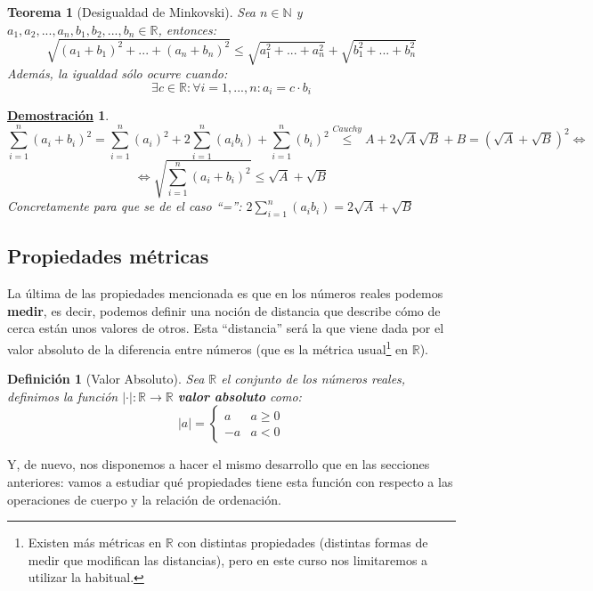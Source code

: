 \documentclass[10pt,a4paper,openright]{book}
\theoremstyle{break}
\newtheorem{defi}{Definición}[chapter]
\newtheorem{theo}{Teorema}[chapter]
\newtheorem*{demo}{\underline{Demostración}}
\begin{document}
\begin{theo}[Desigualdad de Minkovski]
Sea $n\in \mathbb N$ y $a_1, a_2, ..., a_n, b_1, b_2, ..., b_n\in \mathbb R$, entonces:
$$\sqrt{(a_1+b_1)^2+...+(a_n+b_n)^2}\leq \sqrt{a_1^2+...+a_n^2}+\sqrt{b_1^2+...+b_n^2}$$
Además, la igualdad sólo ocurre cuando:
$$\exists c\in \mathbb R : \forall i=1,...,n : a_i=c\cdot b_i$$
\end{theo}
\begin{demo}
$$\sum_{i=1}^n (a_i+b_i)^2=\sum_{i=1}^n (a_i)^2+2\sum_{i=1}^n (a_ib_i)+ \sum_{i=1}^n (b_i)^2\stackrel{Cauchy}{\leq}A+2\sqrt{A}\sqrt{B}+B=(\sqrt{A}+\sqrt{B})^2\Leftrightarrow$$
$$\Leftrightarrow \sqrt{\sum_{i=1}^n (a_i+b_i)^2}\leq \sqrt{A}+\sqrt{B}$$
Concretamente para que se de el caso ``='': $2\sum_{i=1}^n (a_ib_i)=2\sqrt{A}+\sqrt{B}$
\end{demo}

\subsection{Propiedades métricas}
La última de las propiedades mencionada es que en los números reales podemos \textbf{medir}, es decir, podemos definir una noción de distancia que describe cómo de cerca están unos valores de otros. Esta ``distancia'' será la que viene dada por el valor absoluto de la diferencia entre números (que es la métrica usual\footnote{Existen más métricas en $\mathbb{R}$ con distintas propiedades (distintas formas de medir que modifican las distancias), pero en este curso nos limitaremos a utilizar la habitual.} en $\mathbb{R}$).

\begin{defi}[Valor Absoluto]
Sea $\mathbb{R}$ el conjunto de los números reales, definimos la función $|\cdot| : \mathbb{R}\rightarrow \mathbb{R}$ \textbf{valor absoluto} como:
\[
|a|=
\begin{cases}
a & a\geq 0 \\
-a & a<0
\end{cases}
\]
\end{defi}

Y, de nuevo, nos disponemos a hacer el mismo desarrollo que en las secciones anteriores: vamos a estudiar qué propiedades tiene esta función con respecto a las operaciones de cuerpo y la relación de ordenación.
\end{document}
